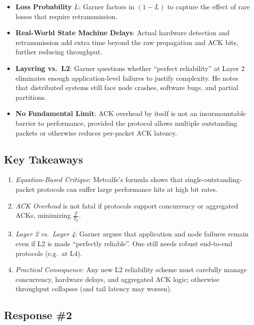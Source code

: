 \begin{itemize}
\item \textbf{Loss Probability} $L$: Garner factors in $(1 - L)$ to capture the effect of rare losses that require retransmission.
\item \textbf{Real-World State Machine Delays}: Actual hardware detection and retransmission add extra time beyond the raw propagation and ACK bits, further reducing throughput.
\item \textbf{Layering vs.\ L2}: Garner questions whether ``perfect reliability'' at Layer 2 eliminates enough application-level failures to justify complexity. He notes that distributed systems still face node crashes, software bugs, and partial partitions.
\item \textbf{No Fundamental Limit}: ACK overhead by itself is not an insurmountable barrier to performance, provided the protocol allows multiple outstanding packets or otherwise reduces per-packet ACK latency.
\end{itemize}

\subsection{Key Takeaways}

\begin{enumerate}
\item \emph{Equation-Based Critique}: Metcalfe’s formula shows that single-outstanding-packet protocols can suffer large performance hits at high bit rates.
\item \emph{ACK Overhead} is not fatal if protocols support concurrency or aggregated ACKs, minimizing $\tfrac{T}{T_p}$.
\item \emph{Layer 2 vs.\ Layer 4}: Garner argues that application and node failures remain even if L2 is made ``perfectly reliable''. One still needs robust end-to-end protocols (e.g.\ at L4).
\item \emph{Practical Consequence}: Any new L2 reliability scheme must carefully manage concurrency, hardware delays, and aggregated ACK logic; otherwise throughput collapses (and tail latency may worsen).
\end{enumerate}


\newpage
\subsection{Response \#2}

%


